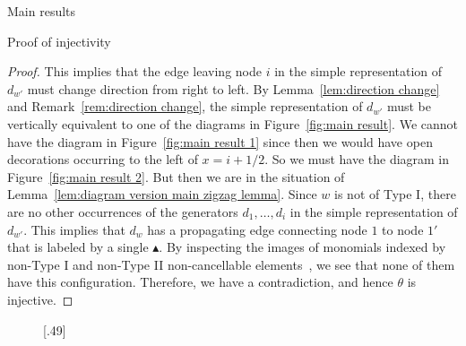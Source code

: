 \documentclass[11pt]{amsart}
\theoremstyle{definition}
\numberwithin{equation}{section}
\newcommand{\x}{\mathsf{x}}
\newcommand{\btri}{\blacktriangle}
\renewcommand{\(}{\left(}
\renewcommand{\)}{\right)}
\begin{document}
\begin{section}{Main results}
\begin{subsection}{Proof of injectivity}
\begin{proof}
This implies that the edge leaving node $i$ in the simple representation of $d_{w'}$ must change direction from right to left.  By Lemma~\ref{lem:direction change} and Remark~\ref{rem:direction change}, the  simple representation of $d_{w'}$ must be vertically equivalent to one of the diagrams in Figure~\ref{fig:main result}.  We cannot have the diagram in Figure~\ref{fig:main result 1} since then we would have open decorations occurring to the left of $x=i+1/2$.  So we must have the diagram in Figure~\ref{fig:main result 2}.  But then we are in the situation of Lemma~\ref{lem:diagram version main zigzag lemma}.  Since $w$ is not of Type I, there are no other occurrences of the generators $d_{1}, \dots, d_{i}$ in the simple representation of $d_{w'}$.  This implies that $d_{w}$ has a propagating edge connecting node $1$ to node $1'$ that is labeled by a single $\btri$.  By inspecting the images of monomials indexed by non-Type I and non-Type II non-cancellable elements~\cite[Theorem 5.1.1]{Ernst2010}, we see that none of them have this configuration.  Therefore, we have a contradiction, and hence $\theta$ is injective.
\end{proof}

\begin{figure}[!ht]
\subcaptionbox{\label{fig:main result 1}}[.49\linewidth]{
}
\end{figure}
\end{subsection}
\end{section}
\end{document}
